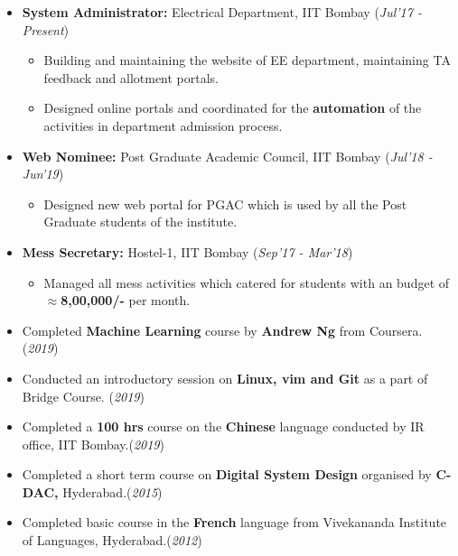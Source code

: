 \documentclass[10pt]{article}
\begin{document}
\begin{itemize}[leftmargin=0.4cm]


\item \textbf {System Administrator:}  Electrical Department, IIT Bombay \hfill{(\textit{Jul'17 - Present})}
\begin{itemize}
    \item Building and maintaining the website of EE department, maintaining TA feedback and allotment portals.
    \item Designed online portals and coordinated for the \textbf{automation} of the activities in department admission process.
\end{itemize}
    


\item \textbf{Web Nominee:} Post Graduate Academic Council, IIT Bombay \hfill{(\textit{Jul'18 - Jun'19})}
\begin{itemize}
	\item Designed new web portal for PGAC which is used by all the Post Graduate students of the institute. 
\end{itemize}

\item \textbf{Mess Secretary:}  Hostel-1, IIT Bombay   \hfill{(\textit{Sep'17 - Mar'18})}
\begin{itemize}
	\item Managed all mess activities which catered for  students with an budget of \textbf{$\approx$8,00,000/-} per month.
\end{itemize}


\end{itemize}
%

\colorbox{bl}{} 

\begin{itemize}[leftmargin=0.4cm]
    \item {Completed \textbf{Machine Learning} course by \textbf{Andrew Ng} from Coursera. }\hfill{(\textit{2019})}
    \item {Conducted an introductory session on \textbf{Linux, vim and Git} as a part of Bridge Course. }\hfill{(\textit{2019})}
    \item {Completed a \textbf{100 hrs} course on the \textbf{Chinese} language conducted by IR office, IIT Bombay.}\hfill{(\textit{2019})}
    \item {Completed a short term course on \textbf{Digital System Design} organised by \textbf{C-DAC,} Hyderabad.}\hfill{(\textit{2015})}
    \item {Completed basic course in the \textbf{French} language from Vivekananda Institute of Languages, Hyderabad.}\hfill{(\textit{2012})}
\end{itemize}

\end{document}
